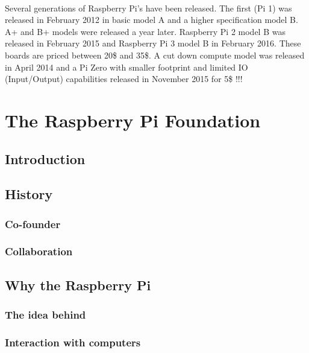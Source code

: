 \documentclass[10pt,a4paper]{article}
\begin{document}
\paragraph{}Several generations of Raspberry Pi's have been released. The first (Pi 1) was released in February 2012 in basic model A and a higher specification model B. A+ and B+ models were released a year later. Raspberry Pi 2 model B was released in February 2015 and Raspberry Pi 3 model B in February 2016. These boards are priced between 20\$ and 35\$. A cut down compute model was released in April 2014 and a Pi Zero with smaller footprint and limited IO (Input/Output) capabilities released in November 2015 for 5\$ !!!

\newpage

\tableofcontents

\newpage

\section{The Raspberry Pi Foundation}

\subsection{Introduction}

\subsection{History}

\subsubsection{Co-founder}

\subsubsection{Collaboration}

\subsection{Why the Raspberry Pi}

\subsubsection{The idea behind}

\subsubsection{Interaction with computers}
\end{document}

